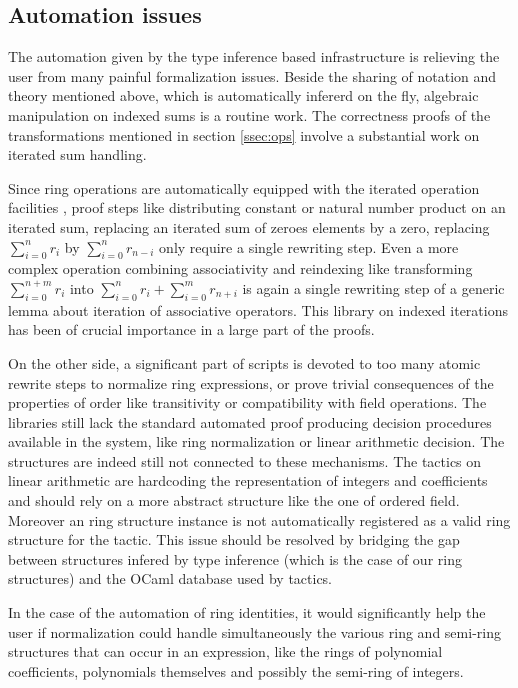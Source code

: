 \documentclass{mscs}
\begin{document}
\subsection{Automation issues}

The automation given by the type inference based infrastructure is
relieving the user from many painful formalization issues. Beside the
sharing of notation and theory mentioned above, which is automatically
infererd on the fly, algebraic manipulation on indexed sums is a
routine work. The correctness proofs of the transformations mentioned
in section \ref{ssec:ops} involve a substantial work on iterated sum
handling.

Since ring operations are automatically equipped with the iterated
operation facilities \cite{bigops}, proof steps like distributing constant or
natural number product on an iterated sum, replacing an iterated sum
of zeroes elements by a zero, replacing $\sum_{i = 0}^n r_i$ by
$\sum_{i = 0}^n r_{n - i}$ only require a single rewriting step.
Even a  more complex operation combining associativity and reindexing
like transforming $\sum_{i = 0}^{n + m} r_i$ into
$\sum_{i = 0}^{n} r_i + \sum_{i = 0}^{m} r_{n + i}$ is again a single
rewriting step of a generic lemma about iteration of associative
operators. This \ssr{} library on indexed iterations has been of crucial
importance in a large part of the proofs.


On the other side, a significant part of scripts is devoted to too
many atomic rewrite steps to normalize ring expressions, or prove trivial
consequences of the properties of order like transitivity or
compatibility with field operations. The \ssr{} libraries still
lack the standard
automated proof producing decision procedures available in the \Coq{}
system, like ring normalization or linear arithmetic decision. The
\ssr{} structures are indeed still not connected to these
mechanisms. The \Coq{} tactics on linear arithmetic are hardcoding the
representation of integers and coefficients and should rely on a more
abstract structure like the one of ordered field. Moreover an \ssr{}
ring structure instance is not automatically registered as a
valid ring structure for the  tactic. This issue should be
resolved by bridging the gap between structures infered by type inference
(which is the case of our ring structures) and the OCaml database used
by \Coq{} tactics.

In the case of the automation of ring identities, it would significantly
help the user if normalization could handle simultaneously the various
ring and semi-ring structures that can occur in an expression, like
the rings of polynomial coefficients, polynomials themselves and
possibly the semi-ring of integers.
\end{document}
